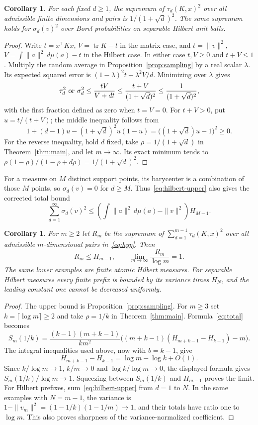 \documentclass[11pt]{article}
\newtheorem{corollary}[theorem]{Corollary}
\begin{document}
\begin{corollary}\label{cor:pointwise}
For each fixed $d\geq1$, the supremum of $\tau_d(K,x)^2$ over all
admissible finite dimensions and pairs is
$1/(1+\sqrt d)^2$. The same supremum holds for $\sigma_d(v)^2$ over
Borel probabilities on separable Hilbert unit balls.
\end{corollary}
\begin{proof}
Write $t=x^\top Kx$, $V=\operatorname{tr}K-t$ in the matrix case, and
$t=\|v\|^2$, $V=\int\|a\|^2\,d\mu(a)-t$ in the Hilbert case.
In either case $t,V\geq0$ and $t+V\leq1$.
Multiply the random average in Proposition~\ref{prop:sampling} by a real
scalar $\lambda$. Its expected squared error is
$(1-\lambda)^2t+\lambda^2 V/d$.
Minimizing over $\lambda$ gives
\[
 \tau_d^2\ \hbox{or}\ \sigma_d^2
 \leq\frac{tV}{V+dt}\leq\frac{t+V}{(1+\sqrt d)^2}
 \leq\frac1{(1+\sqrt d)^2},
\]
with the first fraction defined as zero when $t=V=0$.
For $t+V>0$, put $u=t/(t+V)$; the middle inequality follows from
\[
 1+(d-1)u-(1+\sqrt d)^2u(1-u)
 =\bigl((1+\sqrt d)u-1\bigr)^2\geq0.
\]
For the reverse inequality, hold $d$ fixed, take
$\rho=1/(1+\sqrt d)$ in Theorem~\ref{thm:main}, and let $m\to\infty$.
Its exact minimum tends to
$\rho(1-\rho)/(1-\rho+d\rho)=1/(1+\sqrt d)^2$.
\end{proof}

For a measure on $M$ distinct support points, its barycenter is a
combination of those $M$ points, so $\sigma_d(v)=0$ for $d\geq M$.
Thus~\eqref{eq:hilbert-upper} also gives the corrected total bound
\[
 \sum_{d=1}^\infty\sigma_d(v)^2
 \leq\left(\int\|a\|^2\,d\mu(a)-\|v\|^2\right)H_{M-1}.
\]

\begin{corollary}\label{cor:sharp}
For $m\geq2$ let $R_m$ be the supremum of
$\sum_{d=1}^{m-1}\tau_d(K,x)^2$ over all admissible $m$-dimensional pairs
in~\eqref{eq:hyp}. Then
\[
 R_m\leq H_{m-1},\qquad \lim_{m\to\infty}\frac{R_m}{\log m}=1.
\]
The same lower examples are finite atomic Hilbert measures. For separable
Hilbert measures every finite prefix is bounded by its variance times
$H_N$, and the leading constant one cannot be decreased uniformly.
\end{corollary}
\begin{proof}
The upper bound is Proposition~\ref{prop:sampling}. For $m\geq3$ set
$k=\lceil\log m\rceil\geq2$ and take $\rho=1/k$ in
Theorem~\ref{thm:main}. Formula~\eqref{eq:total} becomes
\[
 S_m(1/k)=\frac{(k-1)(m+k-1)}{km^2}
 \bigl((m+k-1)(H_{m+k-1}-H_{k-1})-m\bigr).
\]
The integral inequalities used above, now with $b=k-1$, give
\[
 H_{m+k-1}-H_{k-1}=\log m-\log k+O(1).
\]
Since $k/\log m\to1$, $k/m\to0$ and $\log k/\log m\to0$, the displayed
formula gives $S_m(1/k)/\log m\to1$.
Squeezing between $S_m(1/k)$ and $H_{m-1}$ proves the limit.
For Hilbert prefixes, sum~\eqref{eq:hilbert-upper} from $d=1$ to $N$.
In the same examples with $N=m-1$, the variance is
$1-\|v_m\|^2=(1-1/k)(1-1/m)\to1$, and their totals have ratio one to
$\log m$. This also proves sharpness of the variance-normalized coefficient.
\end{proof}
\end{document}
